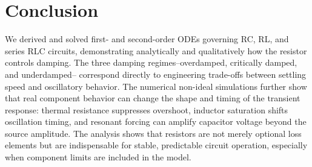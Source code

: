 \section{Conclusion}
\label{sec:conclusion}

We derived and solved first- and second-order ODEs governing RC, RL, and
series RLC circuits, demonstrating analytically and qualitatively how the
resistor controls damping.
The three damping regimes--overdamped, critically damped, and underdamped--
correspond directly to engineering trade-offs between settling speed and
oscillatory behavior.
The numerical non-ideal simulations further show that real component behavior
can change the shape and timing of the transient response: thermal resistance
suppresses overshoot, inductor saturation shifts oscillation timing, and
resonant forcing can amplify capacitor voltage beyond the source amplitude.
The analysis shows that resistors are not merely optional loss elements but
are indispensable for stable, predictable circuit operation, especially when
component limits are included in the model.

